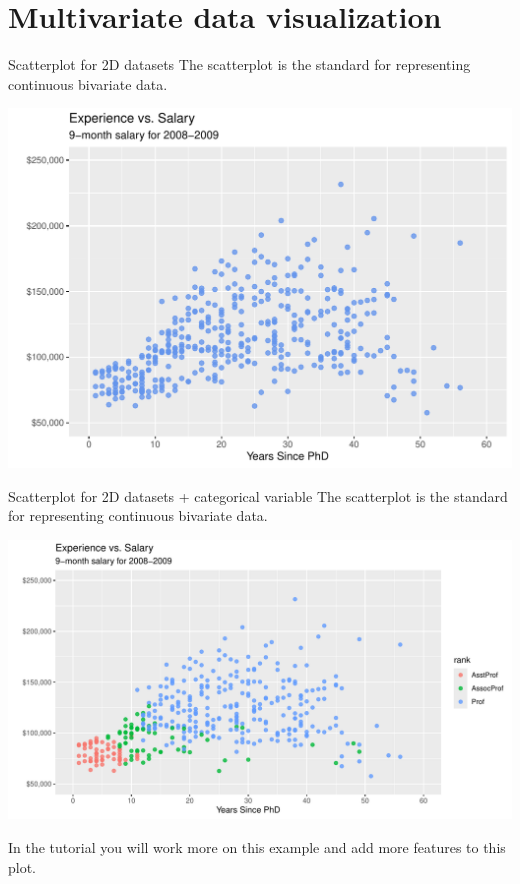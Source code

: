 \documentclass[11pt,handout,aspectratio=169]{beamer}
\begin{document}
\section{Multivariate data visualization}

\begin{frame}[fragile]{Scatterplot for 2D datasets}
	The scatterplot is the standard for representing continuous bivariate data.
	{\scriptsize
\begin{center}
\includegraphics[width=.6\textwidth]{pics/plot1.1.pdf}		
\end{center}}
\end{frame}

\begin{frame}[fragile]{Scatterplot for 2D datasets + categorical variable}
	The scatterplot is the standard for representing continuous bivariate data.
	{\scriptsize
\begin{center}
\includegraphics[width=.7\textwidth]{pics/plot1.2.pdf}		
\end{center}}
In the tutorial you will work more on this example and add more features to this plot.
\end{frame}
\end{document}
